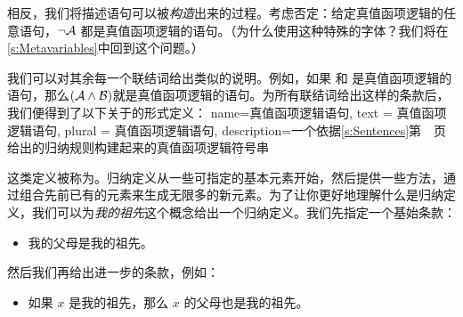 相反，我们将描述语句可以被\emph{构造}出来的过程。考虑否定：给定真值函项逻辑的任意语句，$\neg\mathcal{A}$ 都是真值函项逻辑的语句。（为什么使用这种特殊的字体？我们将在\cref{s:Metavariables}中回到这个问题。）

我们可以对其余每一个联结词给出类似的说明。例如，如果  和  是真值函项逻辑的语句，那么$(\mathcal{A}\wedge\mathcal{B})$就是真值函项逻辑的语句。为所有联结词给出这样的条款后，我们便得到了以下关于的形式定义：
{
name=真值函项逻辑语句,
text = 真值函项逻辑语句,
plural = 真值函项逻辑语句,
description={一个依据\ifHTMLtarget\cref{s:Sentences}\else 第~\pageref{TFLsentences}~页\fi 给出的归纳规则构建起来的真值函项逻辑符号串}
}

这类定义被称为。归纳定义从一些可指定的基本元素开始，然后提供一些方法，通过组合先前已有的元素来生成无限多的新元素。为了让你更好地理解什么是归纳定义，我们可以为\emph{我的祖先}这个概念给出一个归纳定义。我们先指定一个基始条款：


\begin{itemize}
		\item 我的父母是我的祖先。
	\end{itemize}


然后我们再给出进一步的条款，例如：


\begin{itemize}
		\item 如果 $x$ 是我的祖先，那么 $x$ 的父母也是我的祖先。
	\end{itemize}


